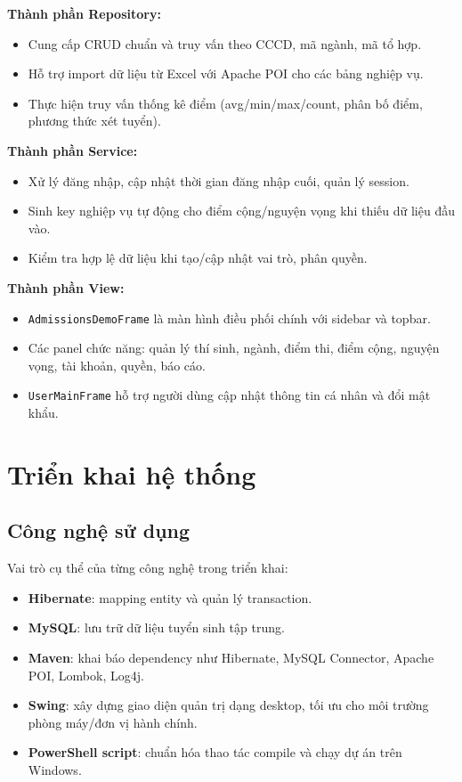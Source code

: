 \documentclass[12pt,a4paper,oneside]{report}
\begin{document}
\textbf{Thành phần Repository:}
\begin{itemize}
  \item Cung cấp CRUD chuẩn và truy vấn theo CCCD, mã ngành, mã tổ hợp.
  \item Hỗ trợ import dữ liệu từ Excel với Apache POI cho các bảng nghiệp vụ.
  \item Thực hiện truy vấn thống kê điểm (avg/min/max/count, phân bố điểm, phương thức xét tuyển).
\end{itemize}

\textbf{Thành phần Service:}
\begin{itemize}
  \item Xử lý đăng nhập, cập nhật thời gian đăng nhập cuối, quản lý session.
  \item Sinh key nghiệp vụ tự động cho điểm cộng/nguyện vọng khi thiếu dữ liệu đầu vào.
  \item Kiểm tra hợp lệ dữ liệu khi tạo/cập nhật vai trò, phân quyền.
\end{itemize}

\textbf{Thành phần View:}
\begin{itemize}
  \item \texttt{AdmissionsDemoFrame} là màn hình điều phối chính với sidebar và topbar.
  \item Các panel chức năng: quản lý thí sinh, ngành, điểm thi, điểm cộng, nguyện vọng, tài khoản, quyền, báo cáo.
  \item \texttt{UserMainFrame} hỗ trợ người dùng cập nhật thông tin cá nhân và đổi mật khẩu.
\end{itemize}

\chapter{Triển khai hệ thống}
\section{Công nghệ sử dụng}
Vai trò cụ thể của từng công nghệ trong triển khai:
\begin{itemize}
  \item \textbf{Hibernate}: mapping entity và quản lý transaction.
  \item \textbf{MySQL}: lưu trữ dữ liệu tuyển sinh tập trung.
  \item \textbf{Maven}: khai báo dependency như Hibernate, MySQL Connector, Apache POI, Lombok, Log4j.
  \item \textbf{Swing}: xây dựng giao diện quản trị dạng desktop, tối ưu cho môi trường phòng máy/đơn vị hành chính.
  \item \textbf{PowerShell script}: chuẩn hóa thao tác compile và chạy dự án trên Windows.
\end{itemize}
\end{document}
